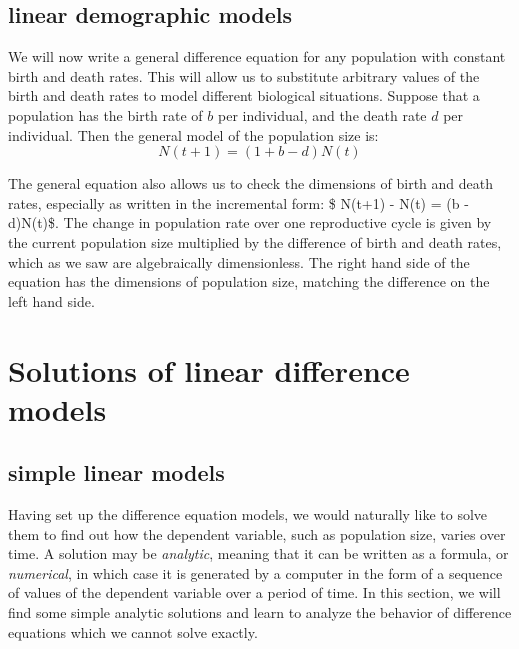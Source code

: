 \documentclass[
  letterpaper,
  DIV=11,
  numbers=noendperiod]{scrreprt}
\begin{document}
\hypertarget{linear-demographic-models}{%
\subsection{linear demographic models}\label{linear-demographic-models}}

We will now write a general difference equation for any population with
constant birth and death rates. This will allow us to substitute
arbitrary values of the birth and death rates to model different
biological situations. Suppose that a population has the birth rate of
\(b\) per individual, and the death rate \(d\) per individual. Then the
general model of the population size is: \begin{equation}
 N(t+1) = (1 + b - d)N(t)
 \label{linear_pop}
\end{equation}

The general equation also allows us to check the dimensions of birth and
death rates, especially as written in the incremental form: \$ N(t+1) -
N(t) = (b - d)N(t)\$. The change in population rate over one
reproductive cycle is given by the current population size multiplied by
the difference of birth and death rates, which as we saw are
algebraically dimensionless. The right hand side of the equation has the
dimensions of population size, matching the difference on the left hand
side. \cite{edelstein-keshet_mathematical_2005}

\hypertarget{solutions-of-linear-difference-models}{%
\section{Solutions of linear difference
models}\label{solutions-of-linear-difference-models}}

\label{sec:math14}

\hypertarget{simple-linear-models}{%
\subsection{simple linear models}\label{simple-linear-models}}

Having set up the difference equation models, we would naturally like to
solve them to find out how the dependent variable, such as population
size, varies over time. A solution may be
 \emph{analytic}, meaning
that it can be written as a formula, or
 \emph{numerical}, in which
case it is generated by a computer in the form of a sequence of values
of the dependent variable over a period of time. In this section, we
will find some simple analytic solutions and learn to analyze the
behavior of difference equations which we cannot solve
exactly.
\end{document}
